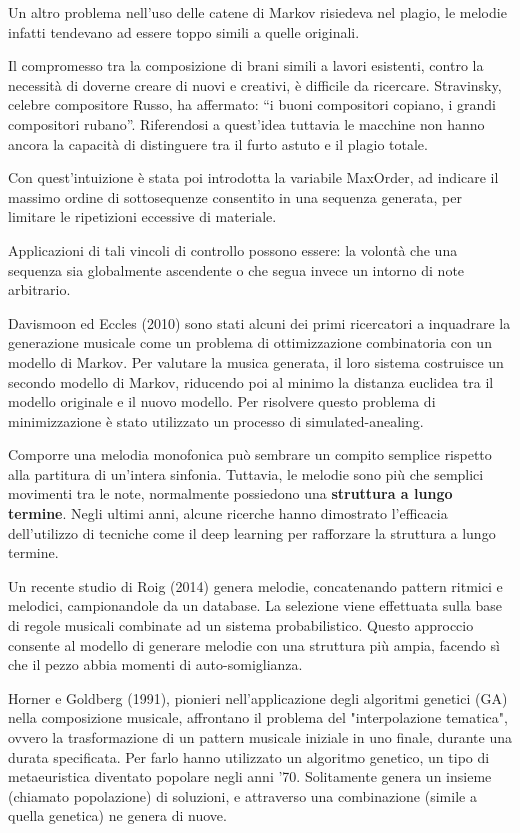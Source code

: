 \documentclass[a4paper,12pt]{report}
\begin{document}
Un altro problema nell'uso delle catene di Markov risiedeva nel plagio, le melodie infatti tendevano ad essere toppo simili a quelle originali.

Il compromesso tra la composizione di brani simili a lavori esistenti, contro la necessità di doverne creare di nuovi e creativi, è difficile da ricercare. 
Stravinsky, celebre compositore Russo, ha affermato: “i buoni compositori copiano, i grandi compositori rubano”.
Riferendosi a quest'idea tuttavia le macchine non hanno ancora la capacità di distinguere tra il furto astuto e il plagio totale.

Con quest'intuizione è stata poi introdotta la variabile MaxOrder, ad indicare il massimo ordine di sottosequenze consentito in una sequenza generata, per limitare le ripetizioni eccessive di materiale.

Applicazioni di tali vincoli di controllo possono essere: la volontà che una sequenza sia globalmente ascendente o che segua invece un intorno di note arbitrario.

Davismoon ed Eccles (2010) sono stati alcuni dei primi ricercatori a inquadrare la generazione musicale come un problema di ottimizzazione combinatoria con un modello di Markov. 
Per valutare la musica generata, il loro sistema costruisce un secondo modello di Markov, riducendo poi al minimo la distanza euclidea tra il modello originale e il nuovo modello. 
Per risolvere questo problema di minimizzazione è stato utilizzato un processo di simulated-anealing.

Comporre una melodia monofonica può sembrare un compito semplice rispetto alla partitura di un'intera sinfonia. 
Tuttavia, le melodie sono più che semplici movimenti tra le note, normalmente possiedono una \textbf{struttura a lungo termine}. 
Negli ultimi anni, alcune ricerche hanno dimostrato l’efficacia dell’utilizzo di tecniche come il deep learning per rafforzare la struttura a lungo termine.

Un recente studio di Roig (2014) genera melodie, concatenando pattern ritmici e melodici, campionandole da un database. 
La selezione viene effettuata sulla base di regole musicali combinate ad un sistema probabilistico. 
Questo approccio consente al modello di generare melodie con una struttura più ampia, facendo sì che il pezzo abbia momenti di auto-somiglianza.

Horner e Goldberg (1991), pionieri nell'applicazione degli algoritmi genetici (GA) nella composizione musicale, affrontano il problema del "interpolazione tematica", ovvero la trasformazione di un pattern musicale iniziale in uno finale, durante una durata specificata. 
Per farlo hanno utilizzato un algoritmo genetico, un tipo di metaeuristica diventato popolare negli anni '70. 
Solitamente genera un insieme (chiamato popolazione) di soluzioni, e attraverso una combinazione (simile a quella genetica) ne genera di nuove.
\end{document}
